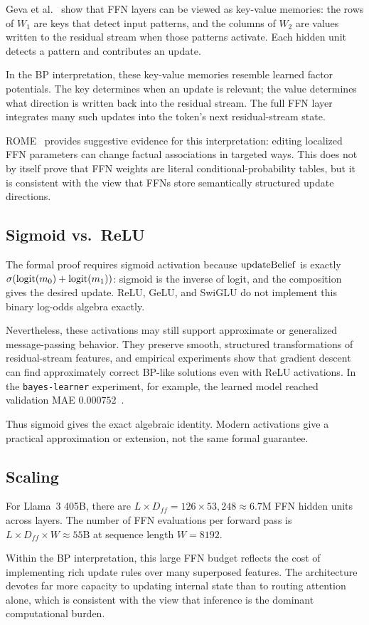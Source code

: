 Geva et al.~\cite{geva2021ffn} show that FFN layers can be viewed as
key-value memories: the rows of $W_1$ are keys that detect input
patterns, and the columns of $W_2$ are values written to the residual
stream when those patterns activate. Each hidden unit detects a pattern
and contributes an update.

In the BP interpretation, these key-value memories resemble learned
factor potentials. The key determines when an update is relevant; the
value determines what direction is written back into the residual
stream. The full FFN layer integrates many such updates into the token's
next residual-stream state.

ROME~\cite{meng2022rome} provides suggestive evidence for this
interpretation: editing localized FFN parameters can change factual
associations in targeted ways. This does not by itself prove that FFN
weights are literal conditional-probability tables, but it is consistent
with the view that FFNs store semantically structured update directions.

\subsection*{Sigmoid vs.\ ReLU}

The formal proof requires sigmoid activation because $\mathrm{updateBelief}$ is
exactly $\sigma(\operatorname{logit}(m_0) + \operatorname{logit}(m_1))$: sigmoid is the inverse of
logit, and the composition gives the desired update. ReLU, GeLU, and
SwiGLU do not implement this binary log-odds algebra exactly.

Nevertheless, these activations may still support approximate or
generalized message-passing behavior. They preserve smooth, structured
transformations of residual-stream features, and empirical experiments
show that gradient descent can find approximately correct BP-like
solutions even with ReLU activations. In the \texttt{bayes-learner}
experiment, for example, the learned model reached validation MAE
$0.000752$~\cite{coppola2026transformers}.

Thus sigmoid gives the exact algebraic identity. Modern activations give
a practical approximation or extension, not the same formal guarantee.

\subsection*{Scaling}

For Llama~3 405B, there are
$L \times D_{ff} = 126 \times 53{,}248 \approx 6.7\mathrm{M}$
FFN hidden units across layers. The number of FFN evaluations per
forward pass is
$L \times D_{ff} \times W \approx 55\mathrm{B}$ at sequence length
$W = 8192$.

Within the BP interpretation, this large FFN budget reflects the cost of
implementing rich update rules over many superposed features. The
architecture devotes far more capacity to updating internal state than
to routing attention alone, which is consistent with the view that
inference is the dominant computational burden.